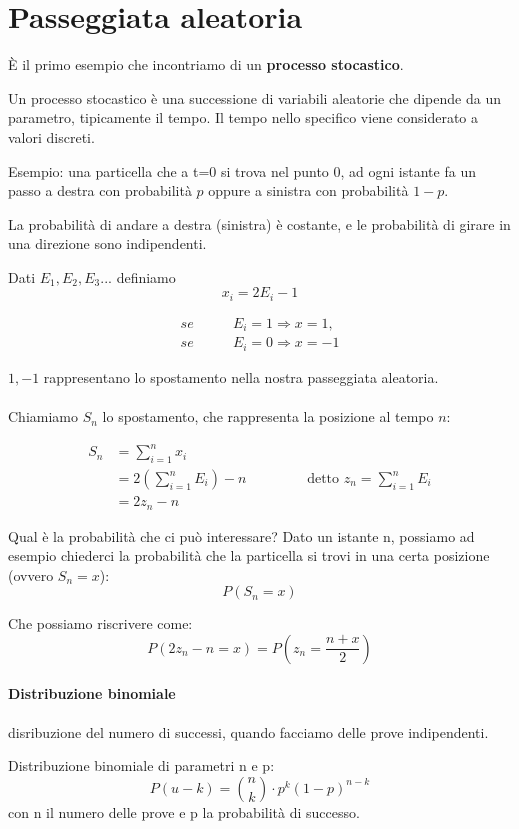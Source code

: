 \documentclass[a4paper,12pt]{book}
\begin{document}
\section{Passeggiata aleatoria}
È il primo esempio che incontriamo di un \textbf{processo stocastico}. 

Un processo stocastico è una successione di variabili aleatorie che dipende da un parametro, tipicamente il tempo. Il tempo nello specifico viene considerato a valori discreti. 

Esempio: una particella che a t=0 si trova nel punto 0, ad ogni istante fa un passo a destra con probabilità $ p $ oppure a sinistra con probabilità $ 1-p $. 

La probabilità di andare a destra (sinistra) è costante, e le probabilità di girare in una direzione sono indipendenti. 

Dati $ E_1, E_2, E_3... $ definiamo
$$x_i = 2E_i - 1$$

\begin{align*}
	se \qquad & E_i = 1 \Rightarrow x=1, \\
	se \qquad & E_i = 0 \Rightarrow x=-1
\end{align*}

$ 1, -1 $ rappresentano lo spostamento nella nostra passeggiata aleatoria. 
\\
\\
Chiamiamo $ S_n $ lo spostamento, che rappresenta la posizione al tempo $ n $:
\begin{center}
\begin{align*}
	S_n & = \sum_{i=1}^{n} x_i \\
	& = 2(\sum_{i=1}^{n}E_i)-n \qquad \qquad \text{ detto } z_n = \sum_{i=1}^{n} E_i \\
	& = 2z_n - n
\end{align*}
\end{center}

Qual è la probabilità che ci può interessare? Dato un istante n, possiamo ad esempio chiederci la probabilità che la particella si trovi in una certa posizione (ovvero $ S_n = x $):
$$ P(S_n = x) $$

Che possiamo riscrivere come:
$$ P(2z_n - n = x) = P(z_n = \frac{n+x}{2})$$


\begin{tcolorbox}
	\paragraph{Distribuzione binomiale} disribuzione del numero di successi, quando facciamo delle prove indipendenti. 
	
	Distribuzione binomiale di parametri n e p:
	$$P(u - k) = \binom{n}{k} \cdot p^k(1-p)^{n-k}$$
	con n il numero delle prove e p la probabilità di successo. 
\end{tcolorbox}
\end{document}
